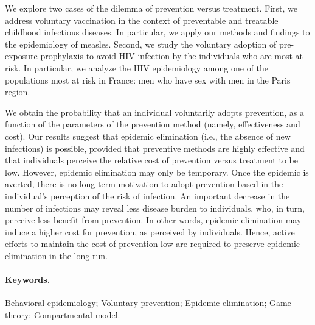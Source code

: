 We explore two cases of the dilemma of prevention versus treatment. First, we address voluntary vaccination in the context of preventable and treatable childhood infectious diseases. In particular, we apply our methods and findings to the epidemiology of measles. 
Second, we study the voluntary adoption of pre-exposure prophylaxis to avoid HIV infection by the individuals who are most at risk. In particular, we analyze the HIV epidemiology among one of the populations most at risk in France: men who have sex with men in the Paris region.



We obtain the probability that an individual voluntarily adopts prevention, as a function of the parameters of the prevention method (namely, effectiveness and cost). Our results suggest that epidemic elimination (i.e., the absence of new infections) is possible, provided that preventive methods are highly effective and that individuals perceive the relative cost of prevention versus treatment to be low. However, epidemic elimination may only be temporary. Once the epidemic is averted, there is no long-term motivation to adopt prevention based in the individual's perception of the risk of infection. An important decrease in the number of infections may reveal  less disease burden to individuals, who, in turn, perceive less benefit from prevention. In other words, epidemic elimination may induce a higher cost for prevention, as perceived by individuals. Hence, active efforts to maintain the cost of prevention low are required to preserve epidemic elimination in the long run.\\

\paragraph{Keywords.} Behavioral epidemiology; Voluntary prevention; Epidemic elimination; Game theory; Compartmental model.
